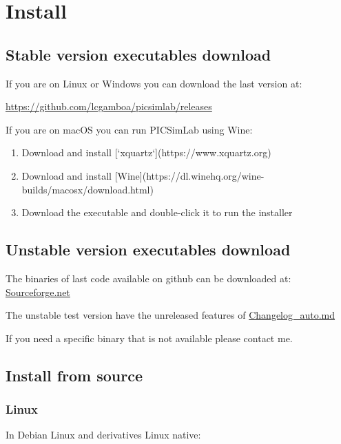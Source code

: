 \chapter{Install}

\section{Stable version executables download} 

If you are on Linux or Windows you can download the last version at:

\href{https://github.com/lcgamboa/picsimlab/releases}{https://github.com/lcgamboa/picsimlab/releases}

If you are on macOS you can run PICSimLab using Wine:

\begin{enumerate}
 \item  Download and install [`xquartz`](https://www.xquartz.org)
 \item  Download and install [Wine](https://dl.winehq.org/wine-builds/macosx/download.html)
 \item  Download the executable and double-click it to run the installer
\end{enumerate}

\section{Unstable version executables download}

The binaries of last code available on github can be downloaded at: \href{https://sourceforge.net/projects/picsim/files/latest\%20code\%20build\%20\%28unstable\%29/}{Sourceforge.net}
 
The unstable test version have the unreleased features of \href{https://github.com/lcgamboa/picsimlab/blob/master/CHANGELOG_auto.md}{Changelog\_auto.md}

If you need a specific binary that is not available please contact me. 

\section{Install from source}\hypertarget{def:isource}{}

\subsection{Linux}

 In Debian Linux and derivatives Linux native:

